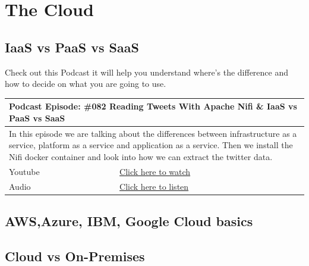 \documentclass[12pt, numbers=noenddot]{scrreprt} %
\begin{document}
\chapter{The Cloud}
\section{IaaS vs PaaS vs SaaS}

Check out this Podcast it will help you understand where's the difference and how to decide on what you are going to use.

\begin{table}[h]
\begin{tabular}{ll}
\hline
\multicolumn{2}{l}{\textbf{Podcast Episode:} \#082 Reading Tweets With Apache Nifi \& IaaS vs PaaS vs SaaS} \\ \hline
\multicolumn{2}{p{15cm}}{In this episode we are talking about the differences between infrastructure as a service, platform as a service and application as a service. Then we install the Nifi docker container and look into how we can extract the twitter data.}         \\ \hline
\multicolumn{1}{l|}{Youtube}   & \href{https://youtu.be/pWuT4UAocUY}{Click here to watch}   \\ 
\multicolumn{1}{l|}{Audio}     & \href{https://anchor.fm/andreaskayy/episodes/082-Reading-Tweets-With-Apache-Nifi--IaaS-vs-PaaS-vs-SaaS-e45j50}{Click here to listen}   \\ \hline
\end{tabular}
\end{table}


\section{AWS,Azure, IBM, Google Cloud basics}
\section{Cloud vs On-Premises}
\end{document}
